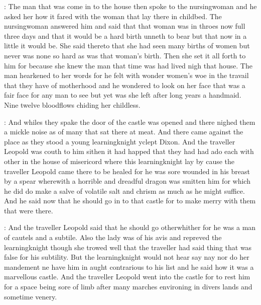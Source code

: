 \documentclass[12pt]{article}
\begin{document}




: The man that was come in to the house then spoke to the
nursingwoman and he asked her how it fared with the woman that lay there
in childbed. The nursingwoman answered him and said that that woman
was in throes now full three days and that it would be a hard birth unneth
to bear but that now in a little it would be. She said thereto that she
had seen many births of women but never was none so hard as was that
woman's birth. Then she set it all forth to him for because she knew the
man that time was had lived nigh that house. The man hearkened to her
words for he felt with wonder women's woe in the travail that they have of
motherhood and he wondered to look on her face that was a fair face for
any man to see but yet was she left after long years a handmaid. Nine
twelve bloodflows chiding her childless.



: And whiles they spake the door of the castle was opened and there
nighed them a mickle noise as of many that sat there at meat. And there
came against the place as they stood a young learningknight yclept Dixon.
And the traveller Leopold was couth to him sithen it had happed that they
had had ado each with other in the house of misericord where this
learningknight lay by cause the traveller Leopold came there to be healed
for he was sore wounded in his breast by a spear wherewith a horrible and
dreadful dragon was smitten him for which he did do make a salve of
volatile salt and chrism as much as he might suffice. And he said now that
he should go in to that castle for to make merry with them that were
there.

: And the traveller Leopold said that he should go otherwhither for
he was a man of cautels and a subtile. Also the lady was of his avis and
repreved the learningknight though she trowed well that the traveller had
said thing that was false for his subtility. But the learningknight would
not hear say nay nor do her mandement ne have him in aught contrarious to
his list and he said how it was a marvellous castle. And the traveller
Leopold went into the castle for to rest him for a space being sore of
limb after many marches environing in divers lands and sometime venery.
\end{document}
